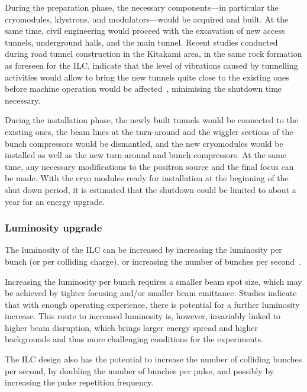 During the preparation phase, the necessary components---in particular the cryomodules, klystrons, and modulators---would be acquired and built.
At the same time, civil engineering would proceed with the excavation of new access tunnels, underground halls, and the main tunnel.
Recent studies conducted during road tunnel construction in the Kitakami area, in the same rock formation as foreseen for the ILC, indicate that the level of vibrations caused by tunnelling activities would allow to bring the new tunnels quite close to the existing ones before machine operation would be affected~\cite{bib:sanuki:lcws2018}, minimising the shutdown time necessary.

During the installation phase, the newly built tunnels would be connected to the existing ones, the beam lines at the turn-around and the wiggler sections of the bunch compressors would be dismantled, and the new cryomodules would be installed as well as the new turn-around and bunch compressors. 
At the same time, any necessary modifications to the positron source and the final focus can be made.
With the cryo modules ready for installation at the beginning of the shut down period, it is estimated that the shutdown could be limited to about a year for an energy upgrade.


\subsubsection{Luminosity upgrade}
\label{subsubsec:upg-optL}

The luminosity of the ILC can be increased by increasing the luminosity per bunch (or per colliding charge), or increasing the number of bunches per second~\cite{Harrison:2013nva}.

Increasing the luminosity per bunch requires a smaller beam spot size, which may be achieved by tighter focusing and/or smaller beam emittance.
Studies indicate that with enough operating experience, there is potential for a further luminosity increase. 
This route to increased luminosity is, however, invariably linked to higher beam disruption, which brings larger energy spread and higher backgrounds and thus more challenging conditions for the experiments.

The ILC design also has the potential to increase the number of colliding bunches per second, by doubling the number of bunches per pulse, and possibly by increasing the pulse repetition frequency.

